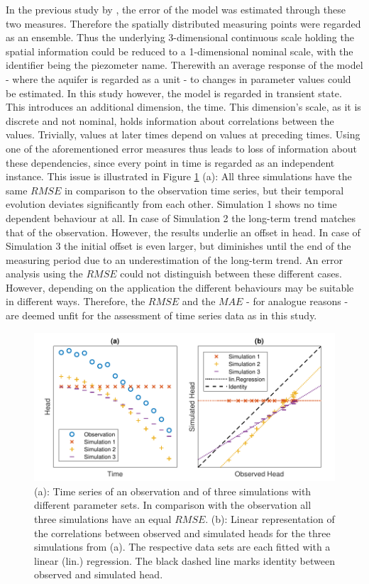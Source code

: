 In the previous study by \textcite{Horn.2021}, the error of the model was estimated through these two measures. 
Therefore the spatially distributed measuring points were regarded as an ensemble. 
Thus the underlying 3-dimensional continuous scale holding the spatial information could be reduced to a 1-dimensional nominal scale, with the identifier being the piezometer name. 
Therewith an average response of the model - where the aquifer is regarded as a unit - to changes in parameter values could be estimated. 
In this study however, the model is regarded in transient state. 
This introduces an additional dimension, the time. 
This dimension's scale, as it is discrete and not nominal, holds information about correlations between the values. 
Trivially, values at later times depend on values at preceding times. 
Using one of the aforementioned error measures thus leads to loss of information about these dependencies, since every point in time is regarded as an independent instance. 
This issue is illustrated in Figure \ref{Fig-RMSEvsCorr} (a): All three simulations have the same $RMSE$ in comparison to the observation time series, but their temporal evolution deviates significantly from each other. 
Simulation 1 shows no time dependent behaviour at all. 
In case of Simulation 2 the long-term trend matches that of the observation. 
However, the results underlie an offset in head. 
In case of Simulation 3 the initial offset is even larger, but diminishes until the end of the measuring period due to an underestimation of the long-term trend. 
An error analysis using the $RMSE$ could not distinguish between these different cases. 
However, depending on the application the different behaviours may be suitable in different ways. 
Therefore, the $RMSE$ and the $MAE$ - for analogue reasons - are deemed unfit for the assessment of time series data as in this study.

\begin{figure}[h]
    \centering
    \includegraphics{./img/Fig-RMSEvsCorr.pdf}
    \caption{(a): Time series of an observation and of three simulations with different parameter sets. In comparison with the observation all three simulations have an equal $RMSE$. (b): Linear representation of the correlations between observed and simulated heads for the three simulations from (a). The respective data sets are each fitted with a linear (lin.) regression. The black dashed line marks identity between observed and simulated head.}
    \label{Fig-RMSEvsCorr}
\end{figure}

